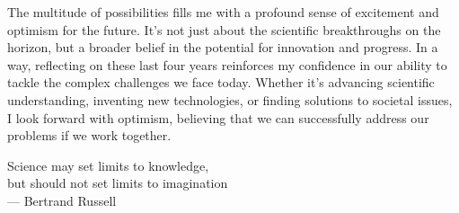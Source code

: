 The multitude of possibilities fills me with a profound sense of excitement and optimism for the future.
It’s not just about the scientific breakthroughs on the horizon, but a broader belief in the potential for innovation and progress.
In a way, reflecting on these last four years reinforces my confidence in our ability to tackle the complex challenges we face today.
Whether it’s advancing scientific understanding, inventing new technologies, or finding solutions to societal issues, I look forward with optimism, believing that we can successfully address our problems if we work together.


\vspace*{3cm}

\begin{raggedleft}
	Science may set limits to knowledge,\\
	but should not set limits to imagination\\
	--- Bertrand Russell\\
\end{raggedleft}